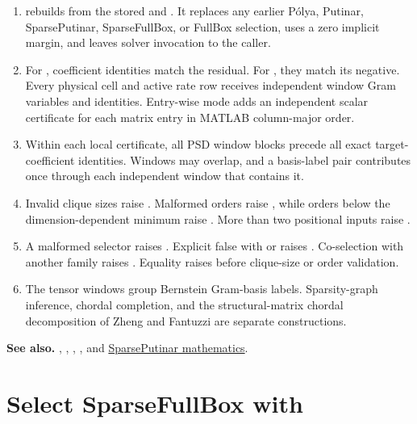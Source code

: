 \remarkshead
\begin{enumerate}[leftmargin=*]
  \item {} rebuilds from the stored  and . It replaces any earlier P\'olya, Putinar, SparsePutinar, SparseFullBox, or FullBox selection, uses a zero implicit margin, and leaves solver invocation to the caller.
  \item For \code{>=}, coefficient identities match the residual. For \code{<=}, they match its negative. Every physical cell and active rate row receives independent window Gram variables and identities. Entry-wise mode adds an independent scalar certificate for each matrix entry in MATLAB column-major order.
  \item Within each local certificate, all PSD window blocks precede all exact target-coefficient identities. Windows may overlap, and a basis-label pair contributes once through each independent window that contains it.
  \item Invalid clique sizes raise . Malformed orders raise , while orders below the dimension-dependent minimum raise . More than two positional inputs raise .
  \item A malformed selector raises . Explicit false with  or  raises . Co-selection with another family raises . Equality raises  before clique-size or order validation.
  \item The tensor windows group Bernstein Gram-basis labels. Sparsity-graph inference, chordal completion, and the structural-matrix chordal decomposition of Zheng and Fantuzzi \cite{zhengfantuzzi2023} are separate constructions.
\end{enumerate}

\noindent\textbf{See also.} \hyperref[sec:pdlmi-putinar]{}, \hyperref[sec:pdlmi-sparse-full-box]{}, \hyperref[sec:pdlmi-full-box]{}, \hyperref[sec:pdlmi-toyalmip]{}, and \hyperref[sec:certificate-sparse-putinar]{SparsePutinar mathematics}.

\section[Select SparseFullBox with \texorpdfstring{\codeplain{useSpBox}}{useSpBox}]{%
Select SparseFullBox with\\[-0.15em] \texorpdfstring{}{useSpBox}}
\label{sec:pdlmi-sparse-full-box}

